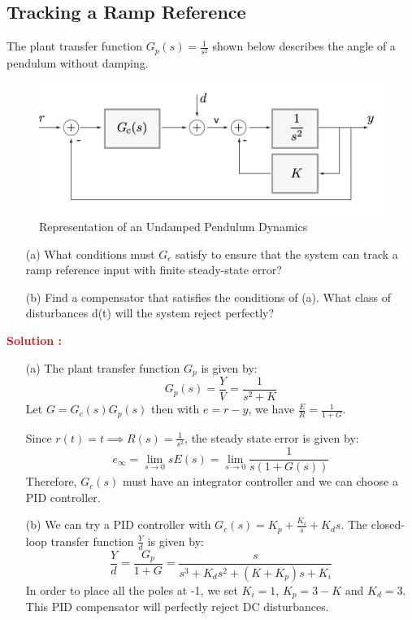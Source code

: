 \documentclass[12pt]{article}
\begin{document}
\subsection{Tracking a Ramp Reference}
The plant transfer function $G_p(s) = \frac{1}{s^2}$ shown below describes the angle of a pendulum without damping.
\begin{figure}[h!]
    \centering
    \includegraphics[width=0.75\linewidth]{figs/4.4.png}
    \caption{Representation of an Undamped Pendulum Dynamics}
    \label{fig:prb39}
\end{figure}
\begin{itemize}
    \item [(a)] What conditions must $G_c$ satisfy to ensure that the system can track a ramp reference input with finite steady-state error?
    \item[(b)] Find a compensator that satisfies the conditions of (a). What class of disturbances d(t) will the system reject perfectly?
\end{itemize}
\textbf{\textcolor{red}{Solution :}} \\
\begin{itemize}
    \item [(a)] The plant transfer function $G_p$ is given by:
    \[
    G_p(s)=\frac{Y}{V}=\frac{1}{s^2+K}
    \]
Let $G=G_c(s)G_p(s)$ then with $e=r-y$, we have $ \frac{E}{R}=\frac{1}{1+G}$.


Since $r(t)=t \implies R(s)=\frac{1}{s^2}$, the steady state error is given by:
\[
e_\infty=\lim_{s \rightarrow 0} s E(s)=\lim_{s \rightarrow 0} \frac{1}{s (1+G(s))}
\]
Therefore, $G_c(s)$ must have an integrator controller and we can choose a PID controller.
    \item[(b)] We can try a PID controller with $G_c(s)=K_p + \frac{K_i}{s} + K_d s$. The closed-loop transfer function $\frac{Y}{d}$ is given by:
    \[
    \frac{Y}{d}=\frac{G_p}{1+G} = \frac{s}{s^3+K_d s^2+ (K+K_p) s+K_i}
    \]
    In order to place all the poles at -1, we set $K_i=1$, $K_p=3-K$ and $K_d=3$. This PID compensator will perfectly reject DC disturbances. 
\end{itemize}
\end{document}
